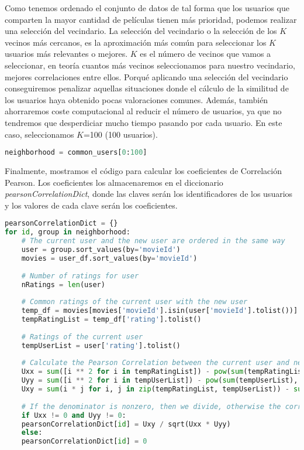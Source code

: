 \documentclass{uimppracticas}
\begin{document}
Como tenemos ordenado el conjunto de datos de tal forma que los usuarios que comparten la mayor cantidad de películas tienen más prioridad, podemos realizar una selección del vecindario. La selección del vecindario o la selección de los $K$ vecinos más cercanos, es la aproximación más común para seleccionar los $K$ usuarios más relevantes o mejores. $K$ es el número de vecinos que vamos a seleccionar, en teoría cuantos más vecinos seleccionamos para nuestro vecindario, mejores correlaciones entre ellos. Porqué aplicando una selección del vecindario conseguiremos penalizar aquellas situaciones donde el cálculo de la similitud de los usuarios haya obtenido pocas valoraciones comunes. Además, también ahorraremos coste computacional al reducir el número de usuarios, ya que no tendremos que desperdiciar mucho tiempo pasando por cada usuario. En este caso, seleccionamos $K$=100 (100 usuarios).

\begin{lstlisting}[language=python, basicstyle=\small]
neighborhood = common_users[0:100]	
\end{lstlisting}

Finalmente, mostramos el código para calcular los coeficientes de Correlación Pearson. Los coeficientes los almacenaremos en el diccionario \textit{pearsonCorrelationDict}, donde las claves serán los identificadores de los usuarios y los valores de cada clave serán los coeficientes. 

\begin{lstlisting}[language=python, basicstyle=\small]
pearsonCorrelationDict = {}
for id, group in neighborhood:
	# The current user and the new user are ordered in the same way
	user = group.sort_values(by='movieId')
	movies = user_df.sort_values(by='movieId')
	
	# Number of ratings for user
	nRatings = len(user)
	
	# Common ratings of the current user with the new user
	temp_df = movies[movies['movieId'].isin(user['movieId'].tolist())]
	tempRatingList = temp_df['rating'].tolist()
	
	# Ratings of the current user
	tempUserList = user['rating'].tolist()
	
	# Calculate the Pearson Correlation between the current user and new user
	Uxx = sum([i ** 2 for i in tempRatingList]) - pow(sum(tempRatingList), 2) / float(nRatings)
	Uyy = sum([i ** 2 for i in tempUserList]) - pow(sum(tempUserList), 2) / float(nRatings)
	Uxy = sum(i * j for i, j in zip(tempRatingList, tempUserList)) - sum(tempRatingList) * sum(tempUserList) / float(nRatings)
	
	# If the denominator is nonzero, then we divide, otherwise the correlation is 0
	if Uxx != 0 and Uyy != 0:
	pearsonCorrelationDict[id] = Uxy / sqrt(Uxx * Uyy)
	else:
	pearsonCorrelationDict[id] = 0
\end{lstlisting}
\end{document}
